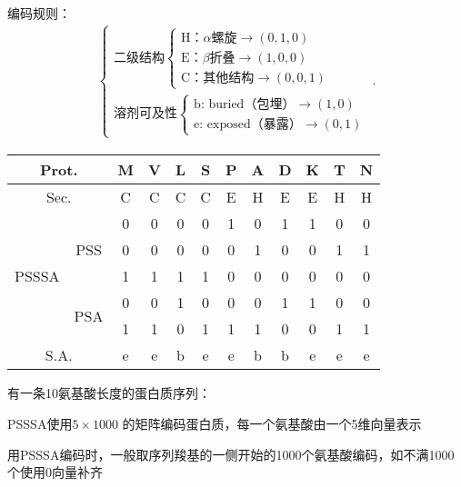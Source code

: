 编码规则：
\begin{align*}
    \begin{cases}
        \text{二级结构}
        \begin{cases}
            \text{H：}\alpha\text{螺旋}\to \left( 0,1,0 \right) \\
            \text{E：}\beta\text{折叠}\to \left( 1,0,0 \right)  \\
            \text{C：其他结构}\to \left( 0,0,1 \right) 
        \end{cases}\\
        \text{溶剂可及性}\begin{cases}
            \text{b: buried（包埋）}\to \left( 1,0 \right) \\
            \text{e: exposed（暴露）}\to \left( 0,1 \right) 
        \end{cases}
    \end{cases}
.\end{align*}
\begin{table}[htpb]
    \centering
    \begin{tabular}{|c|c|c|c|c|c|c|c|c|c|c|c|}
    \hline
    \multicolumn{2}{|c|}{Prot.} & M & V & L & S & P & A & D & K & T & N \\
    \hline
    \multicolumn{2}{|c|}{Sec.} & C & C & C & C & E & H & E & E & H & H \\
    \hline
    \hline
    \multirow{5}{*}{PSSSA}        &\multirow{3}{*}{PSS} & 0 & 0 & 0 & 0 & 1 & 0 & 1 & 1 & 0 & 0 \\
                                  & & 0 & 0 & 0 & 0 & 0 & 1 & 0 & 0 & 1 & 1 \\
                                  & & 1 & 1 & 1 & 1 & 0 & 0 & 0 & 0 & 0 & 0 \\
                                  &\multirow{2}{*}{PSA} & 0 & 0 & 1 & 0 & 0 & 0 & 1 & 1 & 0 & 0 \\
                                  & & 1 & 1 & 0 & 1 & 1 & 1 & 0 & 0 & 1 & 1 \\
                         \hline
                         \hline
    \multicolumn{2}{|c|}{S.A.} & e & e & b & e & e & b & b & e & e & e \\
    \hline
    \end{tabular}
\end{table}
\begin{eg}
    有一条10氨基酸长度的蛋白质序列：

    PSSSA使用$5\times 1000$ 的矩阵编码蛋白质，每一个氨基酸由一个5维向量表示

    用PSSSA编码时，一般取序列羧基的一侧开始的1000个氨基酸编码，如不满1000个使用0向量补齐
\end{eg}

